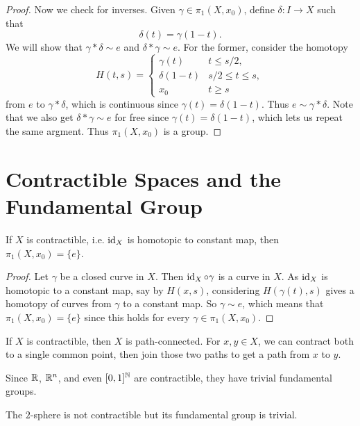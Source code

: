 \begin{proof}
  Now we check for inverses. Given
  $\gamma \in \pi_1(X, x_0)$, define
  $\delta : I \to X$ such that
  \[
    \delta(t) = \gamma(1 - t).
  \]
  We will show that $\gamma * \delta \sim e$ and
  $\delta * \gamma \sim e$. For the former, consider
  the homotopy
  \[
    H(t, s) =
    \begin{cases}
      \gamma(t) & t \le s / 2, \\
      \delta(1 - t) & s / 2 \le t \le s, \\
      x_0 & t \ge s
    \end{cases}
  \]
  from $e$ to $\gamma * \delta$, which is
  continuous since $\gamma(t) = \delta(1 - t)$.
  Thus $e \sim \gamma * \delta$. Note that we also
  get $\delta * \gamma \sim e$ for free since
  $\gamma(t) = \delta(1 - t)$, which lets us
  repeat the same argment.
  Thus $\pi_1(X, x_0)$ is a group.
\end{proof}

\section{Contractible Spaces and the Fundamental Group}

\begin{lemma}
  If $X$ is contractible, i.e. $\operatorname{id}_X$ is homotopic
  to constant map, then $\pi_1(X, x_0) = \{e\}$.
\end{lemma}

\begin{proof}
  Let $\gamma$ be a closed curve in $X$. Then
  $\operatorname{id}_X \circ \gamma$ is a curve in $X$. As
  $\operatorname{id}_X$ is homotopic to a constant map, say by
  $H(x, s)$,
  considering $H(\gamma(t), s)$ gives a homotopy
  of curves from $\gamma$ to a constant map. So
  $\gamma \sim e$, which means that
  $\pi_1(X, x_0) = \{e\}$ since this holds for
  every $\gamma \in \pi_1(X, x_0)$.
\end{proof}

\begin{remark}
  If $X$ is contractible, then $X$ is path-connected.
  For $x, y \in X$, we can contract both to a single
  common
  point, then join those two paths to get a path from
  $x$ to $y$.
\end{remark}

\begin{remark}
  Since $\mathbb{R}$, $\mathbb{R}^n$, and even $[0, 1]^{\mathbb{N}}$ are
  contractible, they have trivial fundamental groups.
\end{remark}

\begin{remark}
  The $2$-sphere is not contractible but its
  fundamental group is trivial.
\end{remark}
